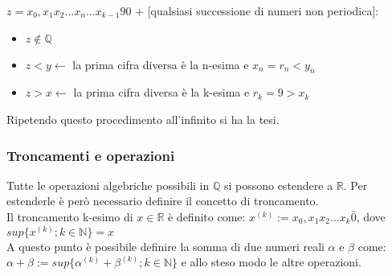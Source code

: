 \documentclass{article}
\begin{document}
$z=x_0,x_1 x_2 ... x_n ... x_{k-1} 9 0$ + [qualsiasi successione di numeri non periodica]: \begin{itemize}
    \item $z \notin \mathds{Q}$
    \item $z < y \leftarrow$ la prima cifra diversa è la n-esima e $x_n=r_n<y_n$
    \item $z > x \leftarrow$ la prima cifra diversa è la k-esima e $r_k=9>x_k$
\end{itemize}
Ripetendo questo procedimento all'infinito si ha la tesi.\\


\subsubsection{Troncamenti e operazioni}
Tutte le operazioni algebriche possibili in $\mathds{Q}$ si possono estendere a $\mathds{R}$. Per estenderle è però necessario definire il concetto di troncamento.\\
Il troncamento k-esimo di $x \in \mathds{R}$ è definito come: $x^{(k)}:=x_0,x_1x_2...x_k \bar{0}$, dove $sup \{x^{(k)}; k\in \mathds{N}\} = x$\\
A questo punto è possibile definire la somma di due numeri reali $\alpha$ e $\beta$ come: $\alpha + \beta := sup \{\alpha^{(k)}+\beta^{(k)}; k\in \mathds{N}\}$ e allo steso modo le altre operazioni.
\end{document}
